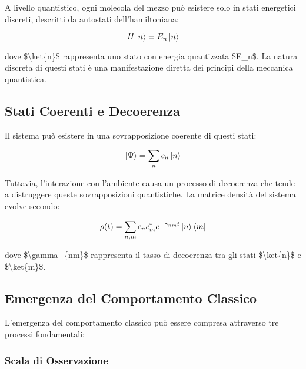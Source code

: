 \documentclass[a4paper,11pt]{article}
\begin{document}
A livello quantistico, ogni molecola del mezzo può esistere solo in
stati energetici discreti, descritti da autostati dell'hamiltoniana:

\begin{displaymath}
H\ket{n} = E_n\ket{n}
\end{displaymath}

dove \$\textbackslash{}ket\{n\}\$ rappresenta uno stato con energia quantizzata \$E\_n\$. La
natura discreta di questi stati è una manifestazione diretta dei
principi della meccanica quantistica.

\subsection{Stati Coerenti e Decoerenza}\hypertarget{stati-coerenti-e-decoerenza}{}\label{stati-coerenti-e-decoerenza}

Il sistema può esistere in una sovrapposizione coerente di questi stati:

\begin{displaymath}
\ket{\Psi} = \sum_n c_n \ket{n}
\end{displaymath}

Tuttavia, l'interazione con l'ambiente causa un processo di decoerenza
che tende a distruggere queste sovrapposizioni quantistiche. La matrice
densità del sistema evolve secondo:

\begin{displaymath}
\rho(t) = \sum_{n,m} c_n c_m^* e^{-\gamma_{nm}t} \ket{n}\bra{m}
\end{displaymath}

dove \$\textbackslash{}gamma\_\{nm\}\$ rappresenta il tasso di decoerenza tra gli stati
\$\textbackslash{}ket\{n\}\$ e \$\textbackslash{}ket\{m\}\$.

\subsection{Emergenza del Comportamento Classico}\hypertarget{emergenza-del-comportamento-classico}{}\label{emergenza-del-comportamento-classico}

L'emergenza del comportamento classico può essere compresa attraverso
tre processi fondamentali:

\subsubsection{Scala di Osservazione}\hypertarget{scala-di-osservazione}{}\label{scala-di-osservazione}
\end{document}
